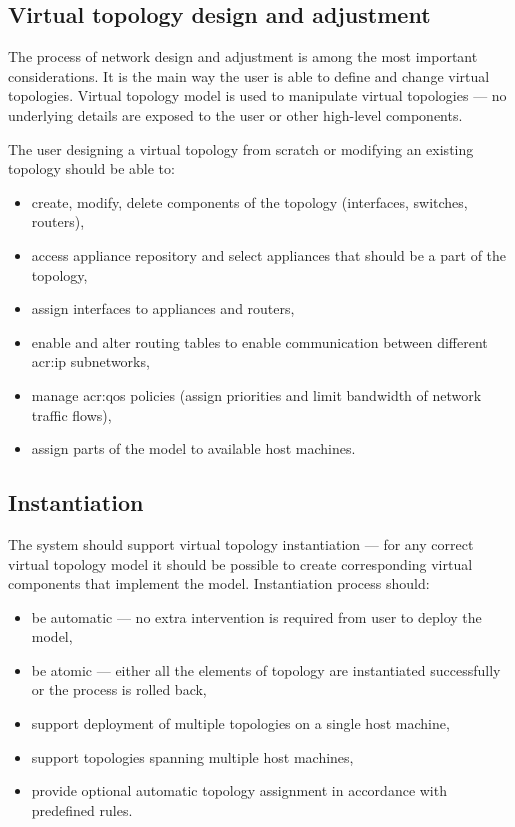 \documentclass[11pt,openany]{book}
\begin{document}
      \subsection{Virtual topology design and adjustment}

        The process of network design and adjustment is among the most important considerations. It is the main
        way the user is able to define and change virtual topologies. Virtual topology model is used to manipulate
        virtual topologies --- no underlying details are exposed to the user or other high-level components.

        The user designing a virtual topology from scratch or modifying an existing topology should be able to:

        \begin{itemize}
          \item create, modify, delete components of the topology (interfaces, switches, routers),
          \item access appliance repository and select appliances that should be a part of the topology,
          \item assign interfaces to appliances and routers,
          \item enable and alter routing tables to enable communication between different \gls{acr:ip} subnetworks,
          \item manage \gls{acr:qos} policies (assign priorities and limit bandwidth of network traffic flows),
          \item assign parts of the model to available host machines.
        \end{itemize}


      \subsection{Instantiation}
      \label{sec:req:func:inst}

        The system should support virtual topology instantiation --- for any correct virtual topology model it should be
        possible to create corresponding virtual components that implement the model. Instantiation process should:

        \begin{itemize}
          \item be automatic --- no extra intervention is required from user to deploy the model,
          \item be atomic --- either all the elements of topology are instantiated successfully or the process is rolled
                back,
          \item support deployment of multiple topologies on a single host machine,
          \item support topologies spanning multiple host machines,
          \item provide optional automatic topology assignment in accordance with predefined rules.
        \end{itemize}
\end{document}
